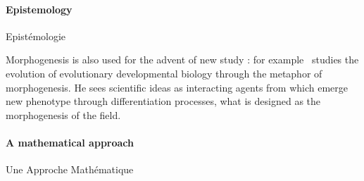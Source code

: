 \paragraph{Epistemology}{Epistémologie}

Morphogenesis is also used for the advent of new study : for example~\cite{gilbert2003morphogenesis} studies the evolution of evolutionary developmental biology through the metaphor of morphogenesis. He sees scientific ideas as interacting agents from which emerge new phenotype through differentiation processes, what is designed as the morphogenesis of the field.


\paragraph{A mathematical approach}{Une Approche Mathématique}


